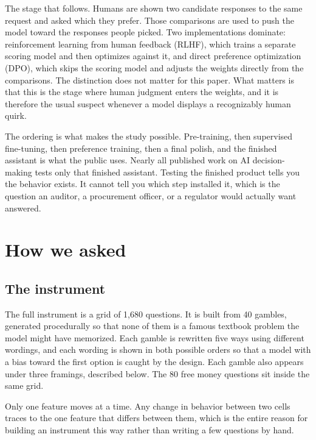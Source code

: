 \documentclass[11pt]{article}
\begin{document}
\begin{keybox}
The stage that follows. Humans are shown two candidate responses to the same request and asked
which they prefer. Those comparisons are used to push the model toward the responses people
picked. Two implementations dominate: reinforcement learning from human feedback (RLHF), which
trains a separate scoring model and then optimizes against it, and direct preference optimization
(DPO), which skips the scoring model and adjusts the weights directly from the comparisons. The
distinction does not matter for this paper. What matters is that this is the stage where human
judgment enters the weights, and it is therefore the usual suspect whenever a model displays a
recognizably human quirk.
\end{keybox}

The ordering is what makes the study possible. Pre-training, then supervised fine-tuning, then
preference training, then a final polish, and the finished assistant is what the public uses.
Nearly all published work on AI decision-making tests only that finished assistant. Testing the
finished product tells you the behavior exists. It cannot tell you which step installed it,
which is the question an auditor, a procurement officer, or a regulator would actually want
answered.

\section{How we asked}

\subsection{The instrument}

The full instrument is a grid of 1{,}680 questions. It is built from 40 gambles, generated
procedurally so that none of them is a famous textbook problem the model might have memorized.
Each gamble is rewritten five ways using different wordings, and each wording is shown in both
possible orders so that a model with a bias toward the first option is caught by the design.
Each gamble also appears under three framings, described below. The 80 free money questions sit
inside the same grid.

Only one feature moves at a time. Any change in behavior between two cells traces to the one
feature that differs between them, which is the entire reason for building an instrument this
way rather than writing a few questions by hand.
\end{document}
